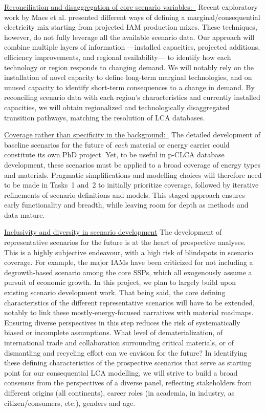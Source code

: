 \documentclass[compact]{nserc} %
\begin{document}
\begin{markdown}
\underline{Reconciliation and disaggregation of core scenario variables:~} Recent exploratory work by Maes et al. presented different ways of defining a marginal/consequential electricity mix starting from projected IAM production mixes. These techniques, however, do not fully leverage all the available scenario data. Our approach will combine multiple layers of information ---installed capacities, projected additions, efficiency improvements, and regional availability--- to identify how each technology or region responds to changing demand. We will notably rely on the installation of novel capacity to define long-term marginal technologies, and on unused capacity to identify short-term consequences to a change in demand. By reconciling scenario data with each region’s characteristics and currently installed capacities, we will obtain regionalized and technologically disaggregated transition pathways, matching the resolution of LCA databases.

\underline{Coverage rather than specificity in the background:~} The detailed development of baseline scenarios for the future of \emph{each} material or energy carrier could constitute its own PhD project. Yet, to be useful in p-CLCA database development, these scenarios must be applied to a broad coverage of energy types and materials. Pragmatic simplifications and modelling choices will therefore need to be made in Tasks~1 and~2 to initially prioritize coverage, followed by iterative refinements of scenario definitions and models. This staged approach ensures early functionality and breadth, while leaving room for depth as methods and data mature.

\underline{Inclusivity and diversity in scenario development} The development of representative scenarios for the future is at the heart of prospective analyses. This is a highly subjective endeavour, with a high risk of blindspots in scenario coverage. For example, the major IAMs have been criticized for not including a degrowth-based scenario among the core SSPs, which all exogenously assume a pursuit of economic growth. In this project, we plan to largely build upon existing scenario development work. That being said, the core defining characteristics of the different representative scenarios will have to be extended, notably to link these mostly-energy-focused narratives with material roadmaps. Ensuring diverse perspectives in this step reduces the risk of systematically biased or incomplete assumptions. What level of dematerialization, of international trade and collaboration surrounding critical materials, or of dismantling and recycling effort can we envision for the future? In identifying these defining characteristics of the prospective scenarios that serve as starting point for our consequential LCA modelling, we will strive to build a broad consensus from the perspectives of a diverse panel, reflecting stakeholders from different origins (all continents), career roles (in academia, in industry, as citizen/consumers, etc.), genders and age.


\end{markdown}
\end{document}
